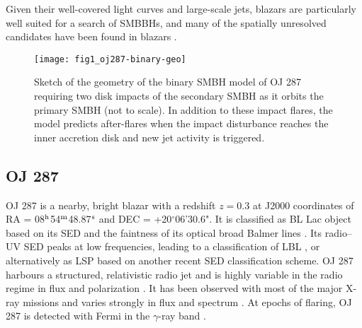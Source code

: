 \documentclass[preprints,article,accept,moreauthors,pdftex]{Definitions/mdpi}
\begin{document}
 Given their well-covered light curves and large-scale jets, blazars are particularly well suited for a search of SMBBHs, and many of the spatially unresolved candidates have been found in blazars \citep{Komossa2016}. 

\begin{figure}
\begin{center}
\texttt{[image: fig1\_oj287-binary-geo]}
	\caption{Sketch of the geometry of the binary SMBH model of OJ 287 requiring two disk impacts of the secondary SMBH as it orbits the primary SMBH (not to scale). In addition to these impact flares, the model predicts after-flares when the impact disturbance reaches the inner accretion disk and new jet activity is triggered. 
     }
     \label{fig:binary-orbit}
\end{center}
\end{figure}    
 
\subsection{OJ 287} 

OJ 287 is a nearby, bright blazar with a redshift $z=0.3$ at J2000 coordinates of RA = 08$^{\rm h}$54$^{\rm m}$48.87$^{\rm s}$ and DEC = +20$^\circ$06'30.6". It is  classified as BL Lac object based on its SED and the faintness of its optical broad Balmer lines \citep{SitkoJunkkarinen1985, Nilsson2010}. Its radio--UV SED peaks at low frequencies, leading to a classification of LBL \citep[low-frequency-peaked blazar;][]{Sambruna1996, Padovani1995}, or alternatively as LSP \citep[low synchrotron peak frequency; $<10^{14}$ Hz;][] {Abdo2010} based on another recent SED classification scheme. 
% 
OJ 287 harbours a structured, relativistic radio jet \citep[e.g.][]{Jorstad2005, Agudo2012, Hodgson2017, Britzen2018, Lee2020} and is highly variable in the radio regime in flux \citep{Valtaoja2000, Fuhrmann2014} and polarization \citep{Aller2014, Myserlis2018, Cohen2018}. It has been observed with most of the major X-ray missions and varies strongly in flux and spectrum \citep[e.g.][] {Madejski1988, Urry1996, Donato2005, Ciprini2007, Massaro2008, Seta2009, Marscher2011, K2013, StrohFalcone2013,
Williamson2014, Siejkowski2017, Gallant2018, Komossa2020, Komossa2021a}. At epochs of flaring, OJ 287 is detected with Fermi in the $\gamma$-ray band \citep{Abdo2009, Agudo2011, Hodgson2017}. 
\end{document}
